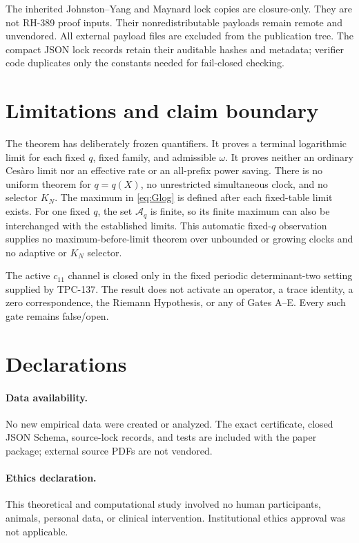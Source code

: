 \documentclass[11pt]{article}
\theoremstyle{definition}
\theoremstyle{remark}
\begin{document}
The inherited Johnston--Yang and Maynard lock copies are closure-only.
They are not RH-389 proof inputs.  Their nonredistributable payloads remain
remote and unvendored.  All external payload files are excluded from the
publication tree.  The compact JSON lock records retain their auditable
hashes and metadata; verifier code duplicates only the constants needed for
fail-closed checking.

\section{Limitations and claim boundary}

The theorem has deliberately frozen quantifiers.  It proves a terminal
logarithmic limit for each fixed $q$, fixed family, and admissible $\omega$.
It proves neither an ordinary Ces\`aro limit nor an effective rate or an
all-prefix power saving.  There is no uniform theorem for $q=q(X)$, no
unrestricted simultaneous clock, and no selector $K_N$.  The maximum in
\eqref{eq:Glog} is defined after each fixed-table limit exists.  For one
fixed $q$, the set $\mathcal A_q$ is finite, so its finite maximum can also
be interchanged with the established limits.  This automatic fixed-$q$
observation supplies no maximum-before-limit theorem over unbounded or
growing clocks and no adaptive or $K_N$ selector.

The active $c_{11}$ channel is closed only in the fixed periodic
determinant-two setting supplied by TPC-137.  The result does not activate
an operator, a trace identity, a zero correspondence, the Riemann
Hypothesis, or any of Gates A--E.  Every such gate remains false/open.

\section*{Declarations}

\paragraph{Data availability.}
No new empirical data were created or analyzed.  The exact certificate,
closed JSON Schema, source-lock records, and tests are included with the
paper package; external source PDFs are not vendored.

\paragraph{Ethics declaration.}
This theoretical and computational study involved no human participants,
animals, personal data, or clinical intervention.  Institutional ethics
approval was not applicable.
\end{document}
